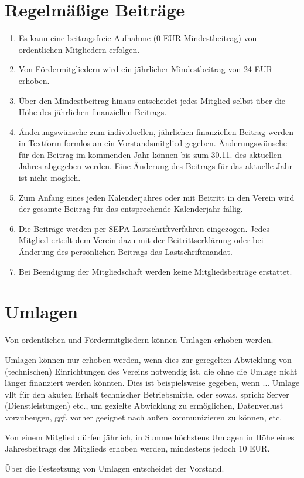 \documentclass[12pt,a4paper,draft]{article}
\begin{document}
\section{Regelmäßige Beiträge}
\begin{enumerate}
\item Es kann eine beitragsfreie Aufnahme (0 EUR Mindestbeitrag) von ordentlichen Mitgliedern erfolgen.

\item Von Fördermitgliedern wird ein jährlicher Mindestbeitrag von 24 EUR erhoben.

\item Über den Mindestbeitrag hinaus entscheidet jedes Mitglied selbst über die Höhe des jährlichen
finanziellen Beitrags.

\item Änderungswünsche zum individuellen, jährlichen finanziellen Beitrag werden in Textform formlos an
ein Vorstandsmitglied gegeben. Änderungswünsche für den Beitrag im kommenden Jahr können bis zum 30.11.
des aktuellen Jahres abgegeben werden. Eine Änderung des Beitrags für das aktuelle Jahr ist nicht möglich.

\item Zum Anfang eines jeden Kalenderjahres oder mit Beitritt in den Verein wird der gesamte Beitrag für
das entsprechende Kalenderjahr fällig.

\item Die Beiträge werden per SEPA-Lastschriftverfahren eingezogen. Jedes Mitglied erteilt dem Verein
dazu mit der Beitrittserklärung oder bei Änderung des persönlichen Beitrags das Lastschriftmandat.

\item Bei Beendigung der Mitgliedschaft werden keine Mitgliedsbeiträge 
erstattet.
\end{enumerate}

\section{Umlagen}

\item Von ordentlichen und Fördermitgliedern können Umlagen erhoben werden.

\item Umlagen können nur erhoben werden, wenn dies zur geregelten Abwicklung von (technischen) Einrichtungen 
des Vereins notwendig ist, die ohne die Umlage nicht länger finanziert werden könnten. Dies ist beispielsweise
gegeben, wenn ... Umlage vllt für den akuten Erhalt technischer Betriebsmittel oder sowas, sprich:
Server (Dienstleistungen) etc., um gezielte Abwicklung zu ermöglichen, Datenverlust vorzubeugen,
ggf. vorher geeignet nach außen kommunizieren zu können, etc.

\item Von einem Mitglied dürfen jährlich, in Summe höchstens Umlagen in Höhe eines Jahresbeitrags des
Mitglieds erhoben werden, mindestens jedoch 10 EUR.

\item Über die Festsetzung von Umlagen entscheidet der Vorstand.
\end{document}
